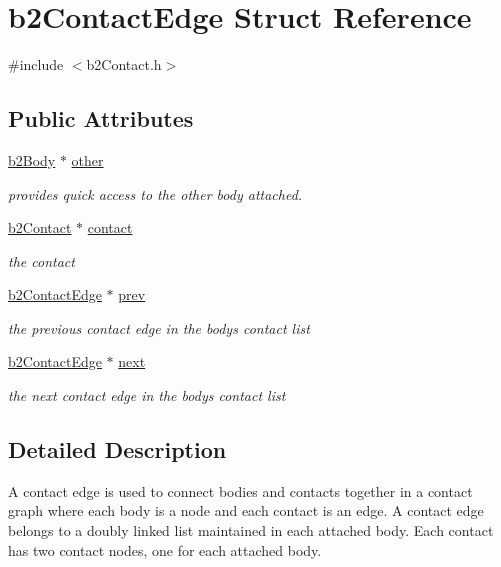 \hypertarget{structb2_contact_edge}{}\section{b2\+Contact\+Edge Struct Reference}
\label{structb2_contact_edge}


{\ttfamily \#include $<$b2\+Contact.\+h$>$}

\subsection*{Public Attributes}
\begin{DoxyCompactItemize}
\item 
\mbox{\hyperlink{classb2_body}{b2\+Body}} $\ast$ \mbox{\hyperlink{structb2_contact_edge_a69015fc22e064eac04ed74f27a13ae78}{other}}
\begin{DoxyCompactList}\small\item\em provides quick access to the other body attached. \end{DoxyCompactList}\item 
\mbox{\hyperlink{classb2_contact}{b2\+Contact}} $\ast$ \mbox{\hyperlink{structb2_contact_edge_a2fbfaffa0dfdf715fd1a709cff939dee}{contact}}
\begin{DoxyCompactList}\small\item\em the contact \end{DoxyCompactList}\item 
\mbox{\hyperlink{structb2_contact_edge}{b2\+Contact\+Edge}} $\ast$ \mbox{\hyperlink{structb2_contact_edge_a606dfacb78dc5c51672e4d7449006b8c}{prev}}
\begin{DoxyCompactList}\small\item\em the previous contact edge in the body\textquotesingle{}s contact list \end{DoxyCompactList}\item 
\mbox{\hyperlink{structb2_contact_edge}{b2\+Contact\+Edge}} $\ast$ \mbox{\hyperlink{structb2_contact_edge_a9af32b3cfadf35a927f4dffcf6338a6d}{next}}
\begin{DoxyCompactList}\small\item\em the next contact edge in the body\textquotesingle{}s contact list \end{DoxyCompactList}\end{DoxyCompactItemize}


\subsection{Detailed Description}
A contact edge is used to connect bodies and contacts together in a contact graph where each body is a node and each contact is an edge. A contact edge belongs to a doubly linked list maintained in each attached body. Each contact has two contact nodes, one for each attached body. 

